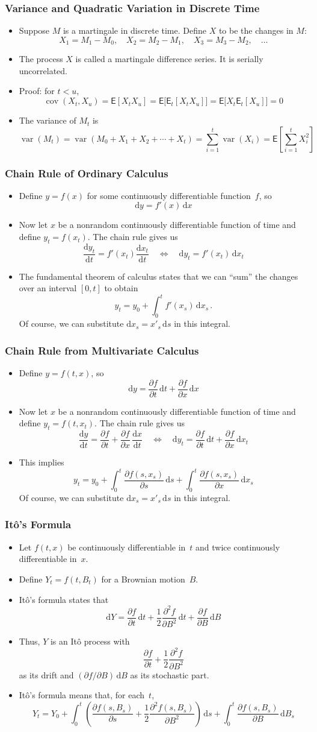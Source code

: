 \documentclass[10pt]{beamer}
\DeclareMathOperator{\var}{var}
\DeclareMathOperator{\cov}{cov}
\newcommand{\bi}{\begin{itemize}}
\newcommand{\ei}{\end{itemize}}
\newcommand{\im}{\item}
\newcommand{\D}{\mathrm{d}}
\newcommand{\mye}{\ensuremath{\mathsf{E}}}
\newcommand{\bfr}{\begin{frame}}
\begin{document}
\bfr\frametitle{Variance and Quadratic Variation in Discrete Time}
\bi
\im Suppose $M$ is a martingale in discrete time.  Define $X$ to be the changes in $M$:
$$X_1 = M_1-M_0, \quad X_2 = M_2 - M_1, \quad X_3 = M_3-M_2, \quad \ldots$$
\im The process $X$ is called a martingale difference series.  It is serially uncorrelated.
\im Proof: for $t<u$,
$$\cov(X_t,X_u) = \mye[X_tX_u] = \mye\bigg[\mye_t[X_tX_u]\bigg] = \mye\bigg[X_t \mye_t[X_u]\bigg] = 0$$
\im The variance of $M_t$ is
$$\var(M_t) = \var(M_0 + X_1 + X_2 + \cdots + X_t) = \sum_{i=1}^t \var(X_i) = \mye\left[\sum_{i=1}^t X_i^2\right]$$
\ei
\end{frame}


\bfr\frametitle{Chain Rule of Ordinary Calculus}
\bi

\im Define $y=f(x)$ for some continuously differentiable function~$f$, so 
$$
\D y = f'(x)\,\D x$$
\im Now let $x$ be a nonrandom continuously differentiable function of time and define $y_t=f(x_t)$.  The chain rule gives us
$$\frac{\D y_t}{\D t} = f'(x_t)\frac{\D x_t}{\D t} \quad \Leftrightarrow \quad \D y_t = f'(x_t)\,\D x_t$$
\im 
The fundamental theorem of calculus states that we can ``sum'' the changes over an interval $[0,t]$ to obtain
$$
y_t = y_0 + \int_0^t f'(x_s)\,\D x_s\,.
$$
Of course, we can  substitute $\D x_s = x'_s\,\D s$ in this integral.

\ei
\end{frame}

\bfr\frametitle{Chain Rule from Multivariate Calculus}
\bi
\im Define $y=f(t,x)$, so
$$\D y = \frac{\partial f}{\partial t}\,\D t + \frac{\partial f}{\partial x}\,\D x$$
\im Now let $x$ be a nonrandom continuously differentiable function of time and define $y_t=f(t,x_t)$.  The chain rule gives us
$$\frac{\D y}{\D t} = \frac{\partial f}{\partial t} + \frac{\partial f}{\partial x}\,\frac{\D x}{\D t} \quad \Leftrightarrow \quad \D y_t = \frac{\partial f}{\partial t}\,\D t + \frac{\partial f}{\partial x}\,\D x_t$$
\im 
This implies
$$
y_t = y_0 + \int_0^t  \frac{\partial f(s,x_s)}{\partial s}\,\D s + \int_0^t  \frac{\partial f(s,x_s)}{\partial x}\,\D x_s
$$
Of course, we can  substitute $\D x_s = x'_s\,\D s$ in this integral.

\ei
\end{frame}

\bfr\frametitle{It\^o's Formula}
\bi
\im  Let $f(t,x)$ be continuously differentiable in~$t$ and twice continuously differentiable in~$x$.  
\im Define $Y_t = f(t,B_t)$ for a Brownian motion~$B$.
\im  
It\^o's formula states that
$$
\D Y = \frac{\partial f}{\partial t}\,\D t + \frac{1}{2}\frac{\partial^2 f}{\partial B^2}\,\D t +\frac{\partial f}{\partial B}\,\D B 
$$
\im Thus, $Y$ is an It\^o process with
$$\frac{\partial f}{\partial t} + \frac{1}{2}\frac{\partial^2 f}{\partial B^2}$$
as its drift and
$(\partial f/\partial B)\,\D B$ as its stochastic part.  
\im It\^o's formula means that, for each~$t$,
$$
Y_t = Y_0+\int_0^t \left(\frac{\partial f(s,B_s)}{\partial s}+ \frac{1}{2}\frac{\partial^2 f(s,B_s)}{\partial B^2}\right)\,\D s + \int_0^t \frac{\partial f(s,B_s)}{\partial B}\,\D B_s
$$
\ei
\end{frame}
\end{document}
